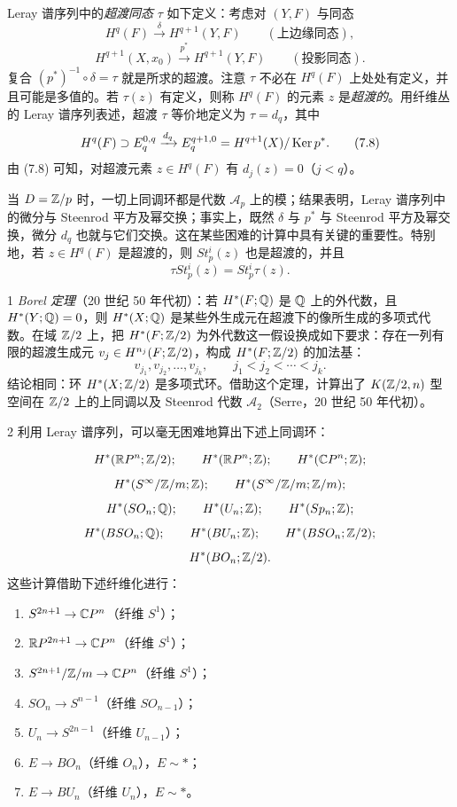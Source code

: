 Leray 谱序列中的\emph{超渡同态} $\tau$ 如下定义：考虑对 $(Y,F)$ 与同态
\[
H^q(F)\xrightarrow{\delta}H^{q+1}(Y,F)\qquad(\text{上边缘同态}),
\]
\[
H^{q+1}(X,x_0)\xrightarrow{p^*}H^{q+1}(Y,F)\qquad(\text{投影同态}).
\]
复合 $(p^*)^{-1}\circ\delta=\tau$ 就是所求的超渡。注意 $\tau$ 不必在 $H^q(F)$ 上处处有定义，并且可能是多值的。若 $\tau(z)$ 有定义，则称 $H^q(F)$ 的元素 $z$ 是\emph{超渡的}。用纤维丛的 Leray 谱序列表述，超渡 $\tau$ 等价地定义为 $\tau=d_q$，其中
\begin{equation}
H^q(F)\supset E_q^{0,q}\xrightarrow{d_q}E_q^{q+1,0}=H^{q+1}(X)/\operatorname{Ker} p^*. \tag{7.8}
\end{equation}
由 (7.8) 可知，对超渡元素 $z\in H^q(F)$ 有 $d_j(z)=0$（$j<q$）。

当 $D=\mathbb{Z}/p$ 时，一切上同调环都是代数 $\mathcal{A}_p$ 上的模；结果表明，Leray 谱序列中的微分与 Steenrod 平方及幂交换；事实上，既然 $\delta$ 与 $p^*$ 与 Steenrod 平方及幂交换，微分 $d_q$ 也就与它们交换。这在某些困难的计算中具有关键的重要性。特别地，若 $z\in H^q(F)$ 是超渡的，则 $St^i_p(z)$ 也是超渡的，并且
\[
\tau St^i_p(z)=St^i_p\tau(z).
\]

\begin{example}{1}
\emph{Borel 定理}（20 世纪 50 年代初）：若 $H^*(F;\mathbb{Q})$ 是 $\mathbb{Q}$ 上的外代数，且 $H^*(Y;\mathbb{Q})=0$，则 $H^*(X;\mathbb{Q})$ 是某些外生成元在超渡下的像所生成的多项式代数。在域 $\mathbb{Z}/2$ 上，把 $H^*(F;\mathbb{Z}/2)$ 为外代数这一假设换成如下要求：存在一列有限的超渡生成元 $v_j\in H^{n_j}(F;\mathbb{Z}/2)$，构成 $H^*(F;\mathbb{Z}/2)$ 的加法基：
\[
v_{j_1},v_{j_2},\dots,v_{j_k},\qquad j_1<j_2<\cdots<j_k.
\]
结论相同：环 $H^*(X;\mathbb{Z}/2)$ 是多项式环。借助这个定理，计算出了 $K(\mathbb{Z}/2,n)$ 型空间在 $\mathbb{Z}/2$ 上的上同调以及 Steenrod 代数 $\mathcal{A}_2$（Serre，20 世纪 50 年代初）。
\end{example}

\begin{example}{2}
利用 Leray 谱序列，可以毫无困难地算出下述上同调环：

\[
H^*(\mathbb{R}P^n;\mathbb{Z}/2);\qquad H^*(\mathbb{R}P^n;\mathbb{Z});\qquad H^*(\mathbb{C}P^n;\mathbb{Z});
\]
\[
H^*(S^\infty/\mathbb{Z}/m;\mathbb{Z});\qquad H^*(S^\infty/\mathbb{Z}/m;\mathbb{Z}/m);
\]
\[
H^*(SO_n;\mathbb{Q});\qquad H^*(U_n;\mathbb{Z});\qquad H^*(Sp_n;\mathbb{Z});
\]
\[
H^*(BSO_n;\mathbb{Q});\qquad H^*(BU_n;\mathbb{Z});\qquad H^*(BSO_n;\mathbb{Z}/2);
\]
\[
H^*(BO_n;\mathbb{Z}/2).
\]
这些计算借助下述纤维化进行：
\begin{enumerate}[label=\arabic*.,leftmargin=2em]
\item $S^{2n+1}\to\mathbb{C}P^n$（纤维 $S^1$）；
\item $\mathbb{R}P^{2n+1}\to\mathbb{C}P^n$（纤维 $S^1$）；
\item $S^{2n+1}/\mathbb{Z}/m\to\mathbb{C}P^n$（纤维 $S^1$）；
\item $SO_n\to S^{n-1}$（纤维 $SO_{n-1}$）；
\item $U_n\to S^{2n-1}$（纤维 $U_{n-1}$）；
\item $E\to BO_n$（纤维 $O_n$），$E\sim*$；
\item $E\to BU_n$（纤维 $U_n$），$E\sim*$。
\end{enumerate}
\end{example}

